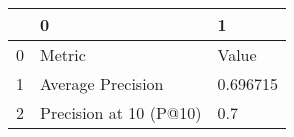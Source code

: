 \begin{tabular}{lll}
\toprule
{} &                       0 &         1 \\
\midrule
0 &                  Metric &     Value \\
1 &       Average Precision &  0.696715 \\
2 &  Precision at 10 (P@10) &       0.7 \\
\bottomrule
\end{tabular}
